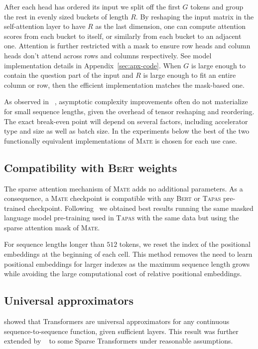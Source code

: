 \documentclass[11pt]{article}
\newcommand{\tapas}{\textsc{Tapas}\xspace}
\newcommand{\bert}{\textsc{Bert}\xspace}
\newcommand{\model}{\textsc{Mate}\xspace}
\begin{document}
After each head has ordered its input we split off the first $G$ tokens and group the rest in evenly sized buckets of length $R$.
By reshaping the input matrix in the self-attention layer to have $R$ as the last dimension,
one can compute attention scores from each bucket to itself, or similarly from each bucket to an adjacent one.
Attention is further restricted with a mask to ensure row heads and column heads don't attend across rows and columns respectively. See model implementation details in Appendix~\ref{sec:apx-code}.
When $G$ is large enough to contain the question part of the input and $R$ is large enough to fit an entire column or row, then the efficient implementation matches the mask-based one.

As observed in ~\citet{ainslie-etal-2020-etc},  asymptotic complexity improvements
often do not materialize for small sequence lengths, given the overhead of
tensor reshaping and reordering. The exact break-even point will depend on several factors,
including accelerator type and size as well as batch size. 
In the experiments below the best of the two functionally equivalent implementations of \model is chosen for each use case.

\subsection{Compatibility with \bert weights}

The sparse attention mechanism of \model 
adds no additional parameters. As a consequence, a \model checkpoint is compatible with any \bert or \tapas pre-trained checkpoint. Following~\citet{herzig-etal-2020-tapas} we obtained best results running the same masked language model pre-training used in \tapas with the same data but using the sparse attention mask of \model.

For sequence lengths longer than $512$ tokens, we reset the index of the positional embeddings at the beginning of each cell.
This method removes the need to learn positional embeddings for larger indexes as the maximum sequence length grows while avoiding the large computational cost of relative positional embeddings.



\subsection{Universal approximators}

\citet{Yun2020Are} showed that Transformers are universal approximators for any continuous sequence-to-sequence function, given sufficient layers.
This result was further extended by ~\citet{univapprox2020, zaheer2020bigbird} to some Sparse Transformers under reasonable assumptions. 
\end{document}
